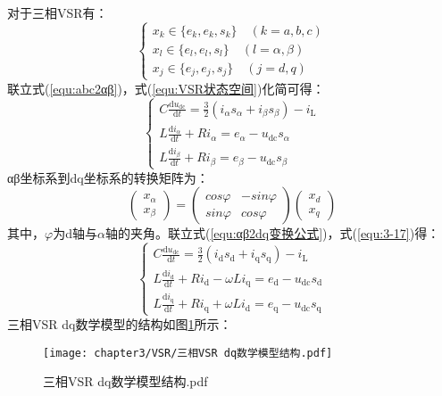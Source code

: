 对于三相VSR有：
\begin{equation}
	\begin{cases}
		x_{k}\in  \{ e_{k},e_{k},s_{k} \} \quad(k=a,b,c)          \\
		x_{l}\in  \{ e_{l},e_{l},s_{l} \} \quad(l=\alpha ,\beta ) \\
		x_{j}\in  \{ e_{j},e_{j},s_{j} \} \quad(j=d,q)
	\end{cases}
\end{equation}
联立式(\ref{equ:abc2αβ})，式(\ref{equ:VSR状态空间})化简可得：
\begin{equation}
	\begin{cases}
		C \frac{\mathrm{d} u_{\mathrm{dc}}}{\mathrm{d} t}=\frac{3}{2}\left(i_{\alpha} s_{\alpha}+i_{\beta} s_{\beta}\right)-i_{\mathrm{L}} \\
		L \frac{\mathrm{d} i_{\alpha}}{\mathrm{d} t}+R i_{\alpha}=e_{\alpha}-u_{\mathrm{dc}} s_{\alpha}                                    \\
		L \frac{\mathrm{d} i_{\beta}}{\mathrm{d} t}+R i_{\beta}=e_{\beta}-u_{\mathrm{dc}} s_{\beta}
	\end{cases}
	\label{equ:3-17}
\end{equation}
αβ坐标系到dq坐标系的转换矩阵为：
\begin{equation}
	\begin{pmatrix}
		x_{\alpha } \\
		x_{\beta }
	\end{pmatrix}=
	\begin{pmatrix}
		cos\varphi & -sin\varphi \\
		sin\varphi & cos\varphi
	\end{pmatrix}
	\begin{pmatrix}
		x_{d } \\
		x_{q}
	\end{pmatrix}
	\label{equ:αβ2dq变换公式}
\end{equation}
其中，$\varphi$为d轴与$\alpha$轴的夹角。联立式(\ref{equ:αβ2dq变换公式})，式(\ref{equ:3-17})得：
\begin{equation}
	\begin{cases}
		C \frac{\mathrm{d} u_{\mathrm{dc}}}{\mathrm{d} t}=\frac{3}{2}\left(i_{\mathrm{d}} s_{\mathrm{d}}+i_{\mathrm{q}} s_{\mathrm{q}}\right)-i_{\mathrm{L}} \\
		L \frac{\mathrm{d} i_{\mathrm{d}}}{\mathrm{d} t}+R i_{\mathrm{d}}-\omega L i_{\mathrm{q}}=e_{\mathrm{d}}-u_{\mathrm{dc}} s_{\mathrm{d}}              \\
		L \frac{\mathrm{d} i_{\mathrm{q}}}{\mathrm{d} t}+R i_{\mathrm{q}}+\omega L i_{\mathrm{d}}=e_{\mathrm{q}}-u_{\mathrm{dc}} s_{\mathrm{q}}
	\end{cases}
	\label{equ:VSR dq数学模型}
\end{equation}
三相VSR dq数学模型的结构如图\ref{fig:三相VSR dq数学模型结构.pdf}所示：
\begin{figure}[!htp]
	\centering
	\texttt{[image: chapter3/VSR/三相VSR dq数学模型结构.pdf]}
	\caption{三相VSR dq数学模型结构.pdf}
	\label{fig:三相VSR dq数学模型结构.pdf}
\end{figure}

